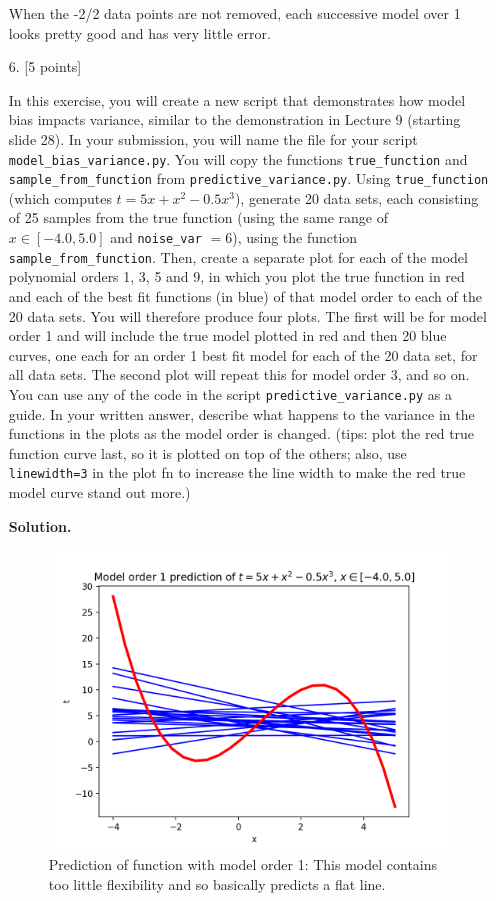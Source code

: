 \documentclass[10pt]{article}
\begin{document}
\begin{itemize}
When the -2/2 data points are not removed, each successive model over 1 looks pretty good and has very little error. 

\item[6.] [5 points]

In this exercise, you will create a new script that demonstrates how model bias impacts variance, similar to the demonstration in Lecture 9 (starting slide 28).  In your submission, you will name the file for your script {\tt model\_bias\_variance.py}.  You will copy the functions {\tt true\_function} and {\tt sample\_from\_function} from {\tt predictive\_variance.py}.  Using {\tt true\_function} (which computes $t = 5x + x^2 - 0.5x^3$), generate 20 data sets, each consisting of 25 samples from the true function (using the same range of $x \in [-4.0, 5.0]$ and {\tt noise\_var} $= 6$), using the function {\tt sample\_from\_function}.  Then, create a separate plot for each of the model polynomial orders 1, 3, 5 and 9, in which you plot the true function in red and each of the best fit functions (in blue) of that model order to each of the 20 data sets.  You will therefore produce four plots.  The first will be for model order 1 and will include the true model plotted in red and then 20 blue curves, one each for an order 1 best fit model for each of the 20 data set, for all data sets.  The second plot will repeat this for model order 3, and so on.  You can use any of the code in the script {\tt predictive\_variance.py} as a guide.  In your written answer, describe what happens to the variance in the functions in the plots as the model order is changed.  (tips: plot the red true function curve last, so it is plotted on top of the others; also, use {\tt linewidth=3} in the plot fn to increase the line width to make the red true model curve stand out more.)

{\bf Solution.} 

\begin{figure}[H]
\centering
  \includegraphics[width=\linewidth]{model_bias-1.png}
 \caption{Prediction of function with model order 1: This model contains too little flexibility and so basically predicts a flat line.}
\label{label}
\end{figure}


\end{itemize}
\end{document}
